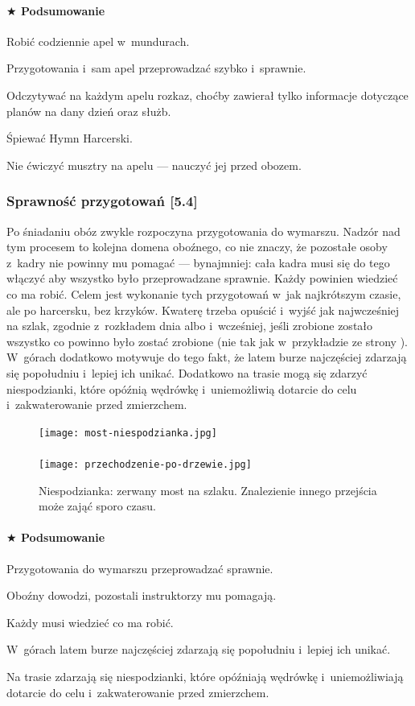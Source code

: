 \documentclass[a5paper,10pt,titlepage,twoside]{article}
\newcommand*{\thecheckbox}{\hss$\Box$} %
\newenvironment*{checklist}
{\list{}{%
\renewcommand*{\makelabel}[1]{\thecheckbox}}}
{\endlist}
\begin{document}
\paragraph{$\bigstar$ Podsumowanie}
\begin{checklist}
\item Robić codziennie apel w~mundurach.
\item Przygotowania i~sam apel przeprowadzać szybko i~sprawnie.
\item Odczytywać na każdym apelu rozkaz, choćby zawierał tylko informacje dotyczące planów na dany dzień oraz służb.
\item Śpiewać Hymn Harcerski.
\item Nie ćwiczyć musztry na apelu --- nauczyć jej przed obozem.
\end{checklist}
\subsubsection{Sprawność przygotowań [5.4]}
Po śniadaniu obóz zwykle rozpoczyna przygotowania do wymarszu. Nadzór nad tym procesem to kolejna domena oboźnego, co nie znaczy, że pozostałe osoby z~kadry nie powinny mu pomagać --- bynajmniej: cała kadra musi się do tego włączyć aby wszystko było przeprowadzane sprawnie. Każdy powinien wiedzieć co ma robić. Celem jest wykonanie tych przygotowań w~jak najkrótszym czasie, ale po harcersku, bez krzyków. Kwaterę trzeba opuścić i~wyjść jak najwcześniej na szlak, zgodnie z~rozkładem dnia albo i~wcześniej, jeśli zrobione zostało wszystko co powinno było zostać zrobione (nie tak jak w~przykładzie ze strony \pageref{kolowrotek}). W~górach dodatkowo motywuje do tego fakt, że latem burze najczęściej zdarzają się popołudniu i~lepiej ich unikać. Dodatkowo na trasie mogą się zdarzyć niespodzianki, które opóźnią wędrówkę i~uniemożliwią dotarcie do celu i~zakwaterowanie przed zmierzchem.
\begin{figure}[htp]
\centering
\texttt{[image: most-niespodzianka.jpg]}\\
~~~~~~~~\\
\texttt{[image: przechodzenie-po-drzewie.jpg]}
\caption{Niespodzianka: zerwany most na szlaku. Znalezienie innego przejścia może zająć sporo czasu.}\label{fig:blondyni}
\end{figure}
\paragraph{$\bigstar$ Podsumowanie}
\begin{checklist}
\item Przygotowania do wymarszu przeprowadzać sprawnie.
\item Oboźny dowodzi, pozostali instruktorzy mu pomagają.
\item Każdy musi wiedzieć co ma robić.
\item W~górach latem burze najczęściej zdarzają się popołudniu i~lepiej ich unikać.
\item Na trasie zdarzają się niespodzianki, które opóźniają wędrówkę i~uniemożliwiają dotarcie do celu i~zakwaterowanie przed zmierzchem.
\end{checklist}
\end{document}
